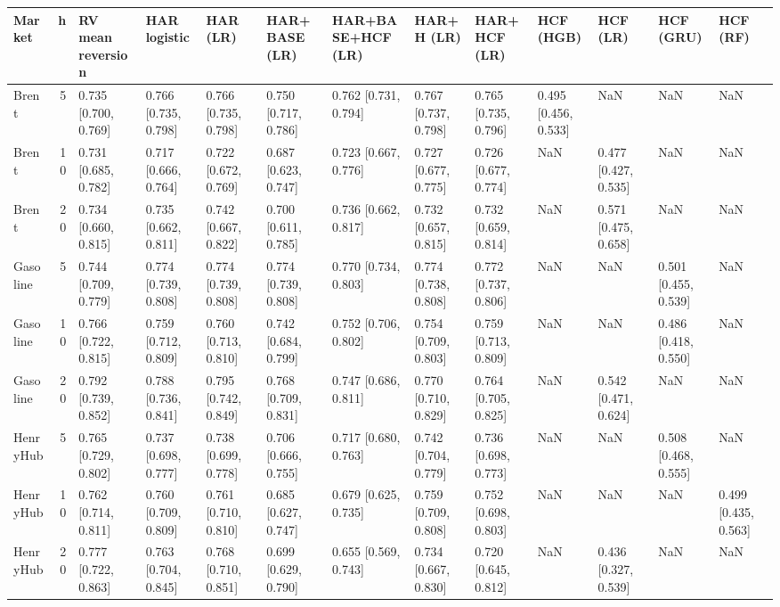 \begin{tabular}{lrlllllllllll}
\toprule
Market & h & RV mean reversion & HAR logistic & HAR (LR) & HAR+BASE (LR) & HAR+BASE+HCF (LR) & HAR+H (LR) & HAR+HCF (LR) & HCF (HGB) & HCF (LR) & HCF (GRU) & HCF (RF) \\
\midrule
Brent & 5 & 0.735 [0.700, 0.769] & 0.766 [0.735, 0.798] & 0.766 [0.735, 0.798] & 0.750 [0.717, 0.786] & 0.762 [0.731, 0.794] & 0.767 [0.737, 0.798] & 0.765 [0.735, 0.796] & 0.495 [0.456, 0.533] & NaN & NaN & NaN \\
Brent & 10 & 0.731 [0.685, 0.782] & 0.717 [0.666, 0.764] & 0.722 [0.672, 0.769] & 0.687 [0.623, 0.747] & 0.723 [0.667, 0.776] & 0.727 [0.677, 0.775] & 0.726 [0.677, 0.774] & NaN & 0.477 [0.427, 0.535] & NaN & NaN \\
Brent & 20 & 0.734 [0.660, 0.815] & 0.735 [0.662, 0.811] & 0.742 [0.667, 0.822] & 0.700 [0.611, 0.785] & 0.736 [0.662, 0.817] & 0.732 [0.657, 0.815] & 0.732 [0.659, 0.814] & NaN & 0.571 [0.475, 0.658] & NaN & NaN \\
Gasoline & 5 & 0.744 [0.709, 0.779] & 0.774 [0.739, 0.808] & 0.774 [0.739, 0.808] & 0.774 [0.739, 0.808] & 0.770 [0.734, 0.803] & 0.774 [0.738, 0.808] & 0.772 [0.737, 0.806] & NaN & NaN & 0.501 [0.455, 0.539] & NaN \\
Gasoline & 10 & 0.766 [0.722, 0.815] & 0.759 [0.712, 0.809] & 0.760 [0.713, 0.810] & 0.742 [0.684, 0.799] & 0.752 [0.706, 0.802] & 0.754 [0.709, 0.803] & 0.759 [0.713, 0.809] & NaN & NaN & 0.486 [0.418, 0.550] & NaN \\
Gasoline & 20 & 0.792 [0.739, 0.852] & 0.788 [0.736, 0.841] & 0.795 [0.742, 0.849] & 0.768 [0.709, 0.831] & 0.747 [0.686, 0.811] & 0.770 [0.710, 0.829] & 0.764 [0.705, 0.825] & NaN & 0.542 [0.471, 0.624] & NaN & NaN \\
HenryHub & 5 & 0.765 [0.729, 0.802] & 0.737 [0.698, 0.777] & 0.738 [0.699, 0.778] & 0.706 [0.666, 0.755] & 0.717 [0.680, 0.763] & 0.742 [0.704, 0.779] & 0.736 [0.698, 0.773] & NaN & NaN & 0.508 [0.468, 0.555] & NaN \\
HenryHub & 10 & 0.762 [0.714, 0.811] & 0.760 [0.709, 0.809] & 0.761 [0.710, 0.810] & 0.685 [0.627, 0.747] & 0.679 [0.625, 0.735] & 0.759 [0.709, 0.808] & 0.752 [0.698, 0.803] & NaN & NaN & NaN & 0.499 [0.435, 0.563] \\
HenryHub & 20 & 0.777 [0.722, 0.863] & 0.763 [0.704, 0.845] & 0.768 [0.710, 0.851] & 0.699 [0.629, 0.790] & 0.655 [0.569, 0.743] & 0.734 [0.667, 0.830] & 0.720 [0.645, 0.812] & NaN & 0.436 [0.327, 0.539] & NaN & NaN \\

\end{tabular}
